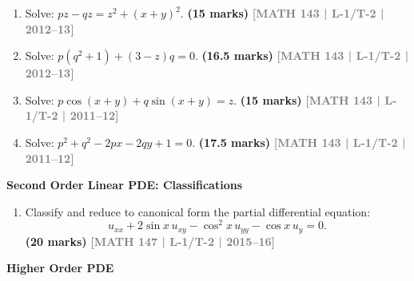 \documentclass[12pt,a3paper]{article}
\newcommand{\yr}[1]{\hfill\textcolor{gray}{\small\textbf{[#1]}}}
\newcommand{\mk}[1]{\textcolor{orange!70!black}{\small\textbf{(#1 marks)}}}
\newcommand{\subtopic}[2]{%
  \vspace{10pt}
  \noindent\begin{tcolorbox}[colback=#1!8,colframe=#1,boxrule=0.6pt,arc=4pt,
    left=6pt,right=6pt,top=4pt,bottom=4pt]
    \small\bfseries\textcolor{#1}{#2}
  \end{tcolorbox}
  \vspace{2pt}
}
\begin{document}
\begin{enumerate}
\item Solve: $pz-qz=z^{2}+(x+y)^{2}$.
\mk{15} \yr{MATH 143 | L-1/T-2 | 2012--13}


\item Solve: $p(q^{2}+1)+(3-z)q=0$.
\mk{16.5} \yr{MATH 143 | L-1/T-2 | 2012--13}


\item Solve: $p\cos(x+y)+q\sin(x+y)=z$.
\mk{15} \yr{MATH 143 | L-1/T-2 | 2011--12}


\item Solve: $p^{2}+q^{2}-2px-2qy+1=0$.
\mk{17.5} \yr{MATH 143 | L-1/T-2 | 2011--12}


\end{enumerate}

\subtopic{cF}{Second Order Linear PDE: Classifications}
\label{sub:s6-second}

\begin{enumerate}

\item Classify and reduce to canonical form the partial differential equation:
\[
u_{xx}+2\sin x\,u_{xy}-\cos^{2}x\,u_{yy}-\cos x\,u_{y}=0.
\]
\mk{20} \yr{MATH 147 | L-1/T-2 | 2015--16}


\end{enumerate}


\subtopic{cF}{Higher Order PDE}
\label{sub:s6-higher}
\end{document}

